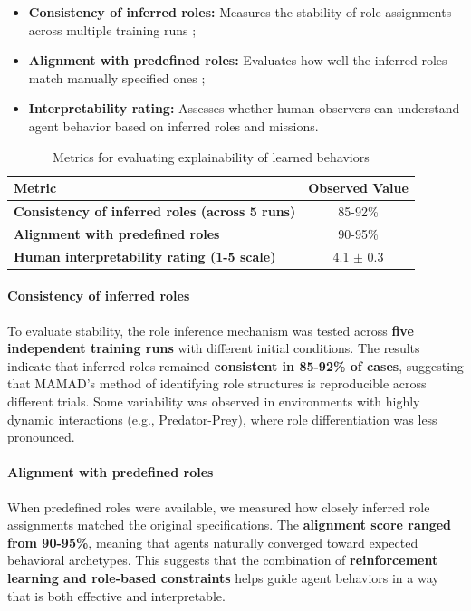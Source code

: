 \documentclass[pdflatex,sn-mathphys-num]{sn-jnl}%
\theoremstyle{thmstyleone}%
\theoremstyle{thmstyletwo}%
\theoremstyle{thmstylethree}%
\begin{document}
\begin{itemize}
    \item \textbf{Consistency of inferred roles:} Measures the stability of role assignments across multiple training runs ;
    \item \textbf{Alignment with predefined roles:} Evaluates how well the inferred roles match manually specified ones ;
    \item \textbf{Interpretability rating:} Assesses whether human observers can understand agent behavior based on inferred roles and missions.
\end{itemize}

\begin{table}[h!]
    \centering
    \caption{Metrics for evaluating explainability of learned behaviors}
    \begin{tabular}{|l|c|}
        \hline
        \textbf{Metric} & \textbf{Observed Value} \\
        \hline
        \textbf{Consistency of inferred roles (across 5 runs)} & 85-92\% \\
        \hline
        \textbf{Alignment with predefined roles} & 90-95\% \\
        \hline
        \textbf{Human interpretability rating (1-5 scale)} & 4.1 $\pm$ 0.3 \\
        \hline
    \end{tabular}
    \label{tab:explainability}
\end{table}

\paragraph{Consistency of inferred roles} 
To evaluate stability, the role inference mechanism was tested across \textbf{five independent training runs} with different initial conditions. The results indicate that inferred roles remained \textbf{consistent in 85-92\% of cases}, suggesting that MAMAD’s method of identifying role structures is reproducible across different trials. Some variability was observed in environments with highly dynamic interactions (e.g., Predator-Prey), where role differentiation was less pronounced.

\paragraph{Alignment with predefined roles}
When predefined roles were available, we measured how closely inferred role assignments matched the original specifications. The \textbf{alignment score ranged from 90-95\%}, meaning that agents naturally converged toward expected behavioral archetypes. This suggests that the combination of \textbf{reinforcement learning and role-based constraints} helps guide agent behaviors in a way that is both effective and interpretable.
\end{document}
